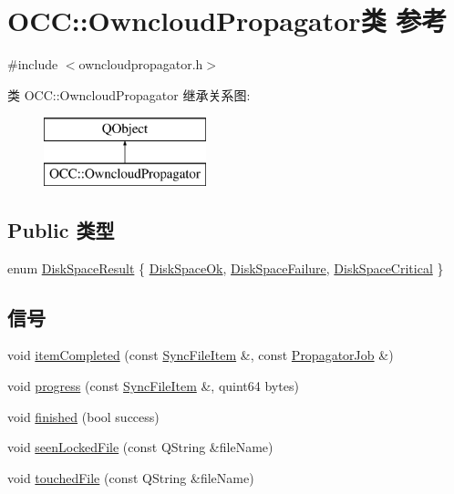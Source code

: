 \hypertarget{class_o_c_c_1_1_owncloud_propagator}{}\section{O\+CC\+:\+:Owncloud\+Propagator类 参考}
\label{class_o_c_c_1_1_owncloud_propagator}


{\ttfamily \#include $<$owncloudpropagator.\+h$>$}

类 O\+CC\+:\+:Owncloud\+Propagator 继承关系图\+:\begin{figure}[H]
\begin{center}
\leavevmode
\includegraphics[height=2.000000cm]{class_o_c_c_1_1_owncloud_propagator}
\end{center}
\end{figure}
\subsection*{Public 类型}
\begin{DoxyCompactItemize}
\item 
enum \hyperlink{class_o_c_c_1_1_owncloud_propagator_ae2cce7b4bd60db44bf8e2b77a11e33be}{Disk\+Space\+Result} \{ \hyperlink{class_o_c_c_1_1_owncloud_propagator_ae2cce7b4bd60db44bf8e2b77a11e33bea4e6bb75b6ebc03a4a384fa1b716ee8ce}{Disk\+Space\+Ok}, 
\hyperlink{class_o_c_c_1_1_owncloud_propagator_ae2cce7b4bd60db44bf8e2b77a11e33bea1bc74581e8d4a57fb8b69c3a49bff517}{Disk\+Space\+Failure}, 
\hyperlink{class_o_c_c_1_1_owncloud_propagator_ae2cce7b4bd60db44bf8e2b77a11e33beaa06a8d32e6dd3930dfc075f6cfa97d83}{Disk\+Space\+Critical}
 \}
\end{DoxyCompactItemize}
\subsection*{信号}
\begin{DoxyCompactItemize}
\item 
void \hyperlink{class_o_c_c_1_1_owncloud_propagator_aa73d79b989e4cf52c66f0f0a3842cc14}{item\+Completed} (const \hyperlink{class_o_c_c_1_1_sync_file_item}{Sync\+File\+Item} \&, const \hyperlink{class_o_c_c_1_1_propagator_job}{Propagator\+Job} \&)
\item 
void \hyperlink{class_o_c_c_1_1_owncloud_propagator_aa83ba6b612d6f37e9be97cd03805f1b4}{progress} (const \hyperlink{class_o_c_c_1_1_sync_file_item}{Sync\+File\+Item} \&, quint64 bytes)
\item 
void \hyperlink{class_o_c_c_1_1_owncloud_propagator_a212fb87896e4797565cbe78ea3caebbf}{finished} (bool success)
\item 
void \hyperlink{class_o_c_c_1_1_owncloud_propagator_ac5efffe29f914985d15d7724a02ea4dd}{seen\+Locked\+File} (const Q\+String \&file\+Name)
\item 
void \hyperlink{class_o_c_c_1_1_owncloud_propagator_a167aa8a8e70143acb11e5eeebe7c8036}{touched\+File} (const Q\+String \&file\+Name)
\end{DoxyCompactItemize}
